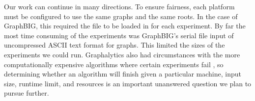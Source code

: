 \documentclass{llncs}
\begin{document}
Our work can continue in many directions. To ensure fairness, each platform must be configured to use the same graphs and the same roots. In the case of GraphBIG, this required the file to be loaded in for each experiment. By far the most time consuming of the experiments was GraphBIG's serial file input of uncompressed ASCII text format for graphs. This limited the sizes of the experiments we could run. Graphalytics also had circumstances with the more computationally expensive algorithms  where certain experiments fail \cite{Iosup:2016:Graphalyticstech}, so determining whether an algorithm will finish given a particular machine, input size, runtime limit, and resources is an important unanswered question we plan to pursue further.



\end{document}
